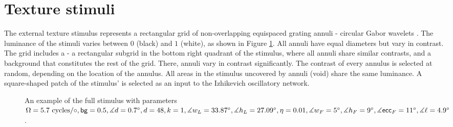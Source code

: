 \section{Texture stimuli}
\label{sec:external-stimuli}

The external texture stimulus represents a rectangular grid of non-overlapping equispaced grating annuli - circular Gabor wavelets \cite{MaryamPLACEHOLDER}. The luminance of the stimuli varies between $0$ (black) and $1$ (white), as shown in Figure \ref{fig:full-stimulus-example}. All annuli have equal diameters but vary in contrast. The grid includes a \stimfig{} - a rectangular subgrid in the bottom right quadrant of the stimulus, where all annuli share similar contrasts, and a background that constitutes the rest of the grid. There, annuli vary in contrast significantly. The contrast of every annulus is selected at random, depending on the location of the annulus. All areas in the stimulus uncovered by annuli (void) share the same luminance. A square-shaped patch of the stimulus' \stimfig{} is selected as an input to the Izhikevich oscillatory network.

\begin{figure}[!htp]
    \centering
    
    \caption[Full stimulus annotated]{An example of the full stimulus with parameters $ \Omega = 5.7 \text{ cycles}/\circ, \mathsf{bg} = 0.5, \measuredangle d = 0.7^\circ, d = 48, k = 1, \measuredangle w_L = 33.87^\circ, \measuredangle h_L = 27.09^\circ, \eta = 0.01, \measuredangle w_F = 5^\circ, \measuredangle h_F = 9^\circ, \measuredangle \mathsf{ecc}_F = 11^\circ, \measuredangle \ell = 4.9^\circ$.}
    \label{fig:full-stimulus-example}
\end{figure}



